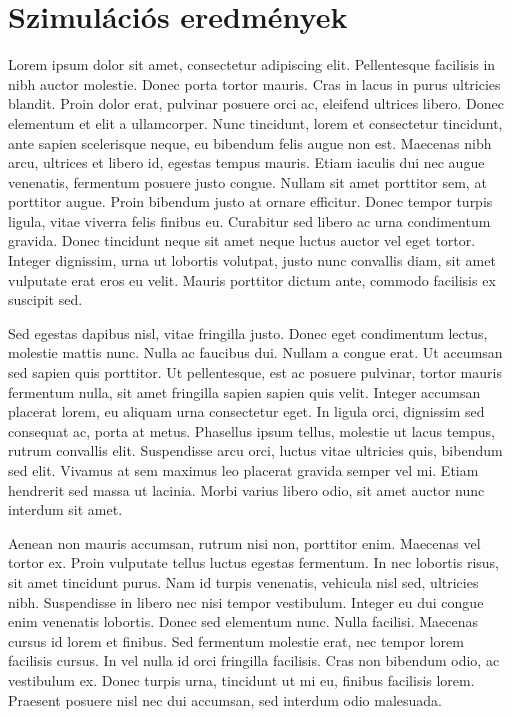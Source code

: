 \chapter{Szimulációs eredmények}
\label{appx:simulation}

Lorem ipsum dolor sit amet, consectetur adipiscing elit. Pellentesque facilisis in nibh auctor molestie. Donec porta tortor mauris. Cras in lacus in purus ultricies blandit. Proin dolor erat, pulvinar posuere orci ac, eleifend ultrices libero. Donec elementum et elit a ullamcorper. Nunc tincidunt, lorem et consectetur tincidunt, ante sapien scelerisque neque, eu bibendum felis augue non est. Maecenas nibh arcu, ultrices et libero id, egestas tempus mauris. Etiam iaculis dui nec augue venenatis, fermentum posuere justo congue. Nullam sit amet porttitor sem, at porttitor augue. Proin bibendum justo at ornare efficitur. Donec tempor turpis ligula, vitae viverra felis finibus eu. Curabitur sed libero ac urna condimentum gravida. Donec tincidunt neque sit amet neque luctus auctor vel eget tortor. Integer dignissim, urna ut lobortis volutpat, justo nunc convallis diam, sit amet vulputate erat eros eu velit. Mauris porttitor dictum ante, commodo facilisis ex suscipit sed.

Sed egestas dapibus nisl, vitae fringilla justo. Donec eget condimentum lectus, molestie mattis nunc. Nulla ac faucibus dui. Nullam a congue erat. Ut accumsan sed sapien quis porttitor. Ut pellentesque, est ac posuere pulvinar, tortor mauris fermentum nulla, sit amet fringilla sapien sapien quis velit. Integer accumsan placerat lorem, eu aliquam urna consectetur eget. In ligula orci, dignissim sed consequat ac, porta at metus. Phasellus ipsum tellus, molestie ut lacus tempus, rutrum convallis elit. Suspendisse arcu orci, luctus vitae ultricies quis, bibendum sed elit. Vivamus at sem maximus leo placerat gravida semper vel mi. Etiam hendrerit sed massa ut lacinia. Morbi varius libero odio, sit amet auctor nunc interdum sit amet.

Aenean non mauris accumsan, rutrum nisi non, porttitor enim. Maecenas vel tortor ex. Proin vulputate tellus luctus egestas fermentum. In nec lobortis risus, sit amet tincidunt purus. Nam id turpis venenatis, vehicula nisl sed, ultricies nibh. Suspendisse in libero nec nisi tempor vestibulum. Integer eu dui congue enim venenatis lobortis. Donec sed elementum nunc. Nulla facilisi. Maecenas cursus id lorem et finibus. Sed fermentum molestie erat, nec tempor lorem facilisis cursus. In vel nulla id orci fringilla facilisis. Cras non bibendum odio, ac vestibulum ex. Donec turpis urna, tincidunt ut mi eu, finibus facilisis lorem. Praesent posuere nisl nec dui accumsan, sed interdum odio malesuada.